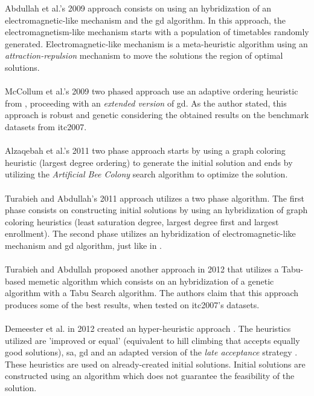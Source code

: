 Abdullah et al.'s 2009 approach \cite{Abdullah2009} consists on using an hybridization of an electromagnetic-like mechanism and the \gls{gd} algorithm. In this approach, the electromagnetism-like mechanism starts with a population of timetables randomly generated. Electromagnetic-like mechanism is a meta-heuristic algorithm using an \textit{attraction-repulsion} mechanism \cite{Javadian2008} to move the solutions the region of optimal solutions.\\
\\
McCollum et al.'s 2009 two phased approach \cite{McCollum2009} use an adaptive ordering heuristic from \cite{Burke2004}, proceeding with an \textit{extended version} of \gls{gd}. As the author stated, this approach is robust and genetic considering the obtained results on the benchmark datasets from \gls{itc2007}.\\
\\
Alzaqebah et al.'s 2011 two phase approach \cite{Alzaqebah2011} starts by using a graph coloring heuristic (largest degree ordering) to generate the initial solution and ends by utilizing the \textit{Artificial Bee Colony} search algorithm to optimize the solution.\\
\\
Turabieh and Abdullah's 2011 approach \cite{Turabieh2011} utilizes a two phase algorithm. The first phase consists on constructing initial solutions by using an hybridization of graph coloring heuristics (least saturation degree, largest degree first and largest enrollment). The second phase utilizes an hybridization of electromagnetic-like mechanism and \gls{gd} algorithm, just like in \cite{Abdullah2009}.\\
\\
Turabieh and Abdullah proposed another approach in 2012 \cite{Abdullah2012} that utilizes a Tabu-based memetic algorithm which consists on an hybridization of a genetic algorithm with a Tabu Search algorithm. The authors claim that this approach produces some of the best results, when tested on \gls{itc2007}'s datasets.\\
\\
Demeester et al. in 2012 created an hyper-heuristic approach \cite{Demeester2012}. The heuristics utilized are 'improved or equal' (equivalent to hill climbing that accepts equally good solutions), \gls{sa}, \gls{gd} and an adapted version of the \textit{late acceptance} strategy \cite{Burke2008}. These heuristics are used on already-created initial solutions. Initial solutions are constructed using an algorithm which does not guarantee the feasibility of the solution.\\
